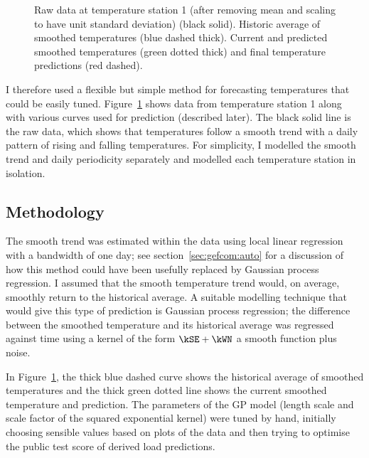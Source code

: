 \begin{figure}[ht]
  \begin{center}
    
  \end{center}
  \caption{Raw data at temperature station 1 (after removing mean and scaling to have unit standard deviation) (black solid). Historic average of smoothed temperatures (blue dashed thick). Current and predicted smoothed temperatures (green dotted thick) and final temperature predictions (red dashed).}
  \label{fig:temp_pred}
\end{figure}

I therefore used a flexible but simple method for forecasting temperatures that could be easily tuned.
Figure~\ref{fig:temp_pred} shows data from temperature station 1 along with various curves used for prediction (described later).
The black solid line is the raw data, which shows that temperatures follow a smooth trend with a daily pattern of rising and falling temperatures.
For simplicity, I modelled the smooth trend and daily periodicity separately and modelled each temperature station in isolation.

\subsection{Methodology}

The smooth trend was estimated within the data using local linear regression \citep[e.g. chapter 6 of][]{Hastie2009-hj} with a bandwidth of one day; see section~\ref{sec:gefcom:auto} for a discussion of how this method could have been usefully replaced by Gaussian process regression.
I assumed that the smooth temperature trend would, on average, smoothly return to the historical average.
A suitable modelling technique that would give this type of prediction is Gaussian process regression; the difference between the smoothed temperature and its historical average was regressed against time using a kernel of the form $\kSE + \kWN$ \ie a smooth function plus noise.

In Figure~\ref{fig:temp_pred}, the thick blue dashed curve shows the historical average of smoothed temperatures and the thick green dotted line shows the current smoothed temperature and prediction.
The parameters of the GP model (length scale and scale factor of the squared exponential kernel) were tuned by hand, initially choosing sensible values based on plots of the data and then trying to optimise the public test score of derived load predictions.

